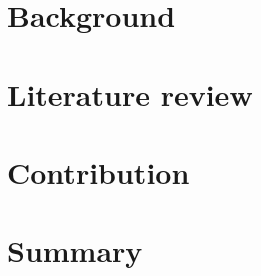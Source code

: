 \documentclass[english,12pt,a4paper,pdftex,sci,utf8]{aaltothesis}
\begin{document}
\thispagestyle{empty}


\clearpage

\section{Background}
\label{sec:background}




\clearpage

\section{Literature review}
\label{sec:similar-systems}




\clearpage

\section{Contribution}
\label{sec:implementation}




\clearpage

\section{Summary} 
\label{sec:summary}

\clearpage





\end{document}
